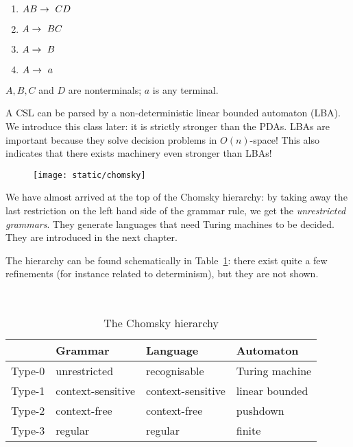 \begin{enumerate}
\item $AB \rightarrow~ CD$
\item $A \rightarrow~ BC$
\item $A \rightarrow~ B$
\item $A \rightarrow~ a$
\end{enumerate}
$A,B,C$ and $D$ are nonterminals; $a$ is any terminal.

A CSL can be parsed by a non-deterministic linear bounded automaton
(LBA). We introduce this class later: it is strictly stronger than the
PDAs. LBAs are important because they solve decision problems in
$O(n)$-space! This also indicates that there exists machinery even
stronger than LBAs!

\begin{wrapfigure}[7]{r}{.2\textwidth}
\texttt{[image: static/chomsky]}
\end{wrapfigure}
We have almost arrived at the top of the Chomsky hierarchy: by taking
away the last restriction on the left hand side of the grammar rule,
we get the {\em unrestricted grammars}. They generate languages that
need Turing machines to be decided. They are introduced in the next
chapter.  %

The hierarchy can be found schematically in Table~\ref{chomskyhier}:
there exist quite a few refinements (for instance related to
determinism), but they are not shown.

~\\

\begin{table}[h]
\centering
\begin{tabular}{l|l|l|l}
         & Grammar          & Language              & Automaton \\ \hline
Type-0   & unrestricted        & recognisable      & Turing machine \\
Type-1   & context-sensitive   & context-sensitive & linear bounded   \\
Type-2   & context-free        & context-free      & pushdown \\
Type-3   & regular            & regular          & finite  \\

\end{tabular}
\caption{The Chomsky hierarchy} \label{chomskyhier}
\end{table}


